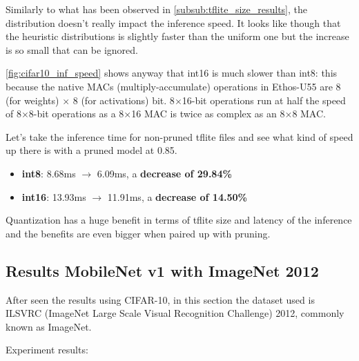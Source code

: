 Similarly to what has been observed in \autoref{subsub:tflite_size_results},
the distribution doesn't really impact the inference speed.
It looks like though that the heuristic distributions is slightly faster than
the uniform one but the increase is so small that can be ignored.

\autoref{fig:cifar10_inf_speed} shows anyway that int16 is much slower than
int8: this because the native MACs (multiply-accumulate) operations in
Ethos-U55 are 8 (for weights) $\times$ 8 (for activations) bit.
8$\times$16-bit operations run at half the speed of 8$\times$8-bit
operations as a 8$\times$16 MAC is twice as complex as an 8$\times$8 MAC\@.

Let's take the inference time for non-pruned tflite files and see what kind of
speed up there is with a pruned model at 0.85.

\begin{itemize}
    \item \textbf{int8}: 8.68ms $\rightarrow$ 6.09ms, a \textbf{decrease of 29.84\%}
    \item \textbf{int16}: 13.93ms $\rightarrow$ 11.91ms, a \textbf{decrease of 14.50\%}
\end{itemize}

Quantization has a huge benefit in terms of tflite size and latency of the
inference and the benefits are even bigger when paired up with pruning.

\subsection{Results MobileNet v1 with ImageNet 2012}
After seen the results using CIFAR-10, in this section the dataset used is
ILSVRC (ImageNet Large Scale Visual Recognition Challenge) 2012, commonly known
as ImageNet.

Experiment results: 
